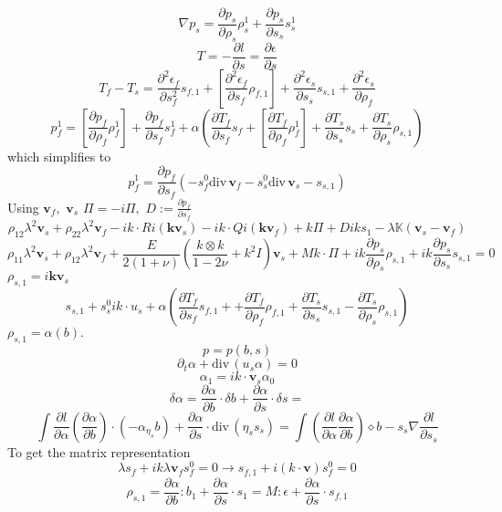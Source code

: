 \documentclass[12pt]{article}
\numberwithin{theorem}{section}
\def\div{\mbox{div}\,}
\newcommand{\di}{{\diamond}}
\begin{document}
\[\nabla p_s = \frac{\partial p_s}{\partial \rho_s} \rho_s^1 + \frac{\partial p_s}{\partial s_s} s_s^1\]
\[T = -\frac{\partial l}{\partial s} = \frac{\partial \epsilon}{\partial s}\]
\[T_f - T_s = \frac{\partial^2 \epsilon_f}{\partial s^2_f} s_{f,1} + [\frac{\partial^2 \epsilon_f}{\partial s_f}\rho_{f,1}] + \frac{\partial^2 \epsilon_s}{\partial s_s}s_{s,1}+\frac{\partial^2 \epsilon_s}{\partial \rho_f}\]
\[p_f^1 = [\frac{\partial p_f}{\partial \rho_f}\rho_f^1] + \frac{\partial p_f}{\partial s_f}s_f^1 + \alpha\left(\frac{\partial T_f}{\partial s_f}s_f + [\frac{\partial T_f}{\partial \rho_f}\rho_f^1] + \frac{\partial T_s}{\partial s_s}s_s + \frac{\partial T_s}{\partial \rho_s} \rho_{s,1}\right)\] which simplifies to
\[p_f^1 = \frac{\partial p_f}{\partial s_f}(-s_f^0 \div \mathbf{v}_f - s_s^0 \div\mathbf{v}_s - s_{s,1})\]
Using $\mathbf{v}_f,$ $\mathbf{v}_s$ $\Pi = -i \Pi,$ $D := \frac{\partial p_f}{\partial s_f}$
\[\rho_{12}\lambda^2 \mathbf{v}_s + \rho_{22}\lambda^2\mathbf{v}_f - ik\cdot Ri(\mathbf{kv}_s)-ik\cdot Q i(\mathbf{kv}_f) + k\Pi + D iks_1 - \lambda \mathbb{K}(\mathbf{v}_s-\mathbf{v}_f)\]
\[\rho_{11}\lambda^2 \mathbf{v}_s + \rho_{12}\lambda^2\mathbf{v}_f + \frac{E}{2(1+\nu)}\left(\frac{k\otimes k}{1-2\nu} + k^2 I\right)\mathbf{v}_s + Mk \cdot \Pi + ik \frac{\partial p_s}{\partial \rho_s}\rho_{s,1} + ik\frac{\partial p_s}{\partial s_s} s_{s,1} =0\]
$\rho_{s,1} = i\mathbf{k} \mathbf{v}_s$
\[s_{s,1} + s^0_s ik\cdot u_s + \alpha \left(
\frac{\partial T_f}{\partial s_f}s_{f,1} +
+\frac{\partial T_f}{\partial \rho_f}\rho_{f,1}
+\frac{\partial T_s}{\partial s_s}s_{s,1}
-\frac{\partial T_s}{\partial \rho_s}\rho_{s,1}
\right)\]
$\rho_{s,1} = \alpha(b).$
\[p=p(b,s)\]
\[\partial_t \alpha + \div (u_s \alpha) =0\]
\[\alpha_1 = ik \cdot \mathbf{v}_s \alpha_0 \]
\[\delta \alpha = 
\frac{\partial \alpha}{\partial b} \cdot \delta b +
\frac{\partial \alpha}{\partial s} \cdot \delta s=\]
\[\int \frac{\partial l}{\partial \alpha} (\frac{\partial \alpha}{\partial b})\cdot(-\alpha_{\eta_s}b)+\frac{\partial \alpha}{\partial s}\cdot \div (\eta_s s_s)=
\int (\frac{\partial l}{\partial \alpha}\frac{\partial \alpha}{\partial b})\di b - s_s \nabla \frac{\partial l}{\partial s_s}\]
To get the matrix representation 
\[\lambda s_f + ik\lambda \mathbf{v}_f s_f^0 =0 \rightarrow s_{f,1}+  i (k\cdot \mathbf{v})s_f^0 =0\]
\[\rho_{s,1} = \frac{\partial \alpha}{\partial b}:b_1 + \frac{\partial \alpha}{\partial s} \cdot s_1 = M:\epsilon + \frac{\partial \alpha}{\partial s}\cdot s_{f,1}\]
\end{document}
